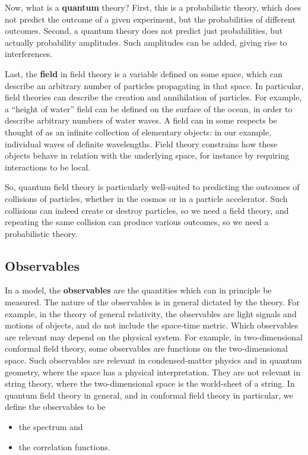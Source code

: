 \documentclass[12pt, a4paper, notitlepage, twoside]{report}
\numberwithin{equation}{section}
\theoremstyle{break}
\begin{document}
Now, what is a \textbf{\boldmath quantum} theory? First, this is a probabilistic theory, which does not predict the outcome of a given experiment, but the probabilities of different outcomes.
Second, a quantum theory does not predict just probabilities, but actually probability amplitudes.
Such amplitudes can be added, giving rise to interferences. 

Last, the \textbf{\boldmath field} in field theory is a variable defined on some space, which can describe an arbitrary number of particles propagating in that space.
In particular, field theories can describe the creation and annihilation of particles.
For example, a ``height of water'' field can be defined on the surface of the ocean, in order to describe arbitrary numbers of water waves.
A field can in some respects be thought of as an infinite collection of elementary objects: in our example, individual waves of definite wavelengths.
Field theory constrains how these objects behave in relation with the underlying space, for instance by requiring interactions to be local.

So, quantum field theory is particularly well-suited to predicting the outcomes of collisions of particles, whether in the cosmos or in a particle accelerator.
Such collisions can indeed create or destroy particles, so we need a field theory, and repeating the same collision can produce various outcomes, so we need a probabilistic theory. 

\subsection{Observables}

In a model, the \textbf{\boldmath observables} are the quantities which can in principle be measured.
The nature of the observables is in general dictated by the theory.
For example, in the theory of general relativity, the observables are light signals and motions of objects, and do not include the space-time metric. 
Which observables are relevant may depend on the physical system.
For example, in two-dimensional conformal field theory, some observables are functions on the two-dimensional space.
Such observables are relevant in condensed-matter physics and in quantum geometry, where the space has a physical interpretation.
They are not relevant in string theory, where the two-dimensional space is the world-sheet of a string. 
In quantum field theory in general, and in conformal field theory in particular, we define the observables to be 
\begin{itemize}
 \item the spectrum and
\item the correlation functions.
\end{itemize}
\end{document}
